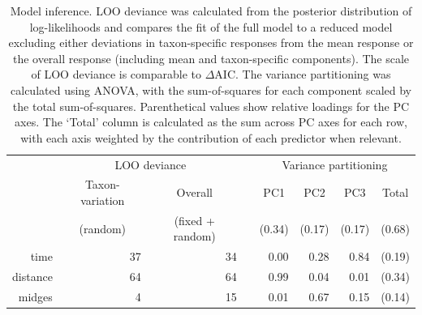 \documentclass[12pt]{article}
\begin{document}

%
% 






\clearpage




\clearpage

\begin{table}
\caption{\label{tab:model-summary}
Model inference.
LOO deviance was calculated from the posterior distribution of log-likelihoods
and compares the fit of the full model to a reduced model excluding either
deviations in taxon-specific responses from the mean response or
the overall response (including mean and taxon-specific components).
The scale of LOO deviance is comparable to $\Delta$AIC.
The variance partitioning was calculated using ANOVA,
with the sum-of-squares for each component scaled by the total sum-of-squares.
Parenthetical values show relative loadings for the PC axes.
The `Total' column is calculated as the sum across PC axes for each row,
with each axis weighted by the contribution of each predictor when relevant.}
\begin{tabular}{rrrrrrrr}
\toprule
 & \multicolumn{2}{c}{LOO deviance} & & \multicolumn{4}{c}{Variance partitioning} \\
 \cmidrule{2-3} \cmidrule{5-8}
 & \multicolumn{1}{c}{Taxon-variation} & \multicolumn{1}{c}{Overall} & &
    \multicolumn{1}{c}{PC1} & \multicolumn{1}{c}{PC2} & \multicolumn{1}{c}{PC3} &
    \multicolumn{1}{c}{Total} \\
& \multicolumn{1}{c}{(random)} & \multicolumn{1}{c}{(fixed + random)} & &
    \multicolumn{1}{c}{(0.34)} & \multicolumn{1}{c}{(0.17)} &
    \multicolumn{1}{c}{(0.17)} & \multicolumn{1}{c}{(0.68)} \\
\midrule
time & 37 & 34 &  & 0.00 & 0.28 & 0.84 & (0.19)\\
distance & 64 & 64 &  & 0.99 & 0.04 & 0.01 & (0.34)\\
midges & 4 & 15 &  & 0.01 & 0.67 & 0.15 & (0.14)\\
\bottomrule
\end{tabular}
\end{table}
\end{document}

